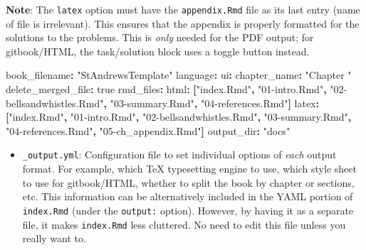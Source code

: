 \documentclass[
  british,
  oneside]{krantz}
\newenvironment{Shaded}{\begin{snugshade}}{\end{snugshade}}
\newcommand{\AttributeTok}[1]{\textcolor[rgb]{0.77,0.63,0.00}{#1}}
\newcommand{\CharTok}[1]{\textcolor[rgb]{0.31,0.60,0.02}{#1}}
\newcommand{\FunctionTok}[1]{\textcolor[rgb]{0.00,0.00,0.00}{#1}}
\newcommand{\KeywordTok}[1]{\textcolor[rgb]{0.13,0.29,0.53}{\textbf{#1}}}
\newcommand{\StringTok}[1]{\textcolor[rgb]{0.31,0.60,0.02}{#1}}
\providecommand{\tightlist}{%
  \setlength{\itemsep}{0pt}\setlength{\parskip}{0pt}}
\theoremstyle{definition}
\theoremstyle{definition}
\theoremstyle{definition}
\theoremstyle{definition}
\theoremstyle{remark}
\begin{document}
\textbf{Note}: The \texttt{latex} option must have the \texttt{appendix.Rmd} file as its last entry (name of file is irrelevant). This ensures that the appendix is properly formatted for the solutions to the problems. This is \emph{only} needed for the PDF output; for gitbook/HTML, the task/solution block uses a toggle button instead.

\begin{Shaded}
\begin{Highlighting}[]
\FunctionTok{book\_filename}\KeywordTok{:}\AttributeTok{ }\StringTok{"StAndrewsTemplate"}
\FunctionTok{language}\KeywordTok{:}
\AttributeTok{  }\FunctionTok{ui}\KeywordTok{:}
\AttributeTok{    }\FunctionTok{chapter\_name}\KeywordTok{:}\AttributeTok{ }\StringTok{"Chapter "}
\FunctionTok{delete\_merged\_file}\KeywordTok{:}\AttributeTok{ }\CharTok{true}
\FunctionTok{rmd\_files}\KeywordTok{:}
\AttributeTok{  }\FunctionTok{html}\KeywordTok{:}\AttributeTok{ }\KeywordTok{[}\StringTok{"index.Rmd"}\KeywordTok{,}\AttributeTok{ }\StringTok{"01{-}intro.Rmd"}\KeywordTok{,}\AttributeTok{ }\StringTok{"02{-}bellsandwhistles.Rmd"}\KeywordTok{,}\AttributeTok{ }\StringTok{"03{-}summary.Rmd"}\KeywordTok{,}\AttributeTok{ }\StringTok{"04{-}references.Rmd"}\KeywordTok{]}
\AttributeTok{  }\FunctionTok{latex}\KeywordTok{:}\AttributeTok{ }\KeywordTok{[}\StringTok{"index.Rmd"}\KeywordTok{,}\AttributeTok{ }\StringTok{"01{-}intro.Rmd"}\KeywordTok{,}\AttributeTok{ }\StringTok{"02{-}bellsandwhistles.Rmd"}\KeywordTok{,}\AttributeTok{ }\StringTok{"03{-}summary.Rmd"}\KeywordTok{,}\AttributeTok{  }\StringTok{"04{-}references.Rmd"}\KeywordTok{,}\AttributeTok{ }\StringTok{"05{-}ch\_appendix.Rmd"}\KeywordTok{]}
\FunctionTok{output\_dir}\KeywordTok{:}\AttributeTok{ }\StringTok{"docs"}
\end{Highlighting}
\end{Shaded}

\begin{itemize}
\tightlist
\item
  \texttt{\_output.yml}: Configuration file to set individual options of \emph{each} output format. For example, which TeX typesetting engine to use, which style sheet to use for gitbook/HTML, whether to split the book by chapter or sections, etc. This information can be alternatively included in the YAML portion of \texttt{index.Rmd} (under the \texttt{output:} option). However, by having it as a separate file, it makes \texttt{index.Rmd} less cluttered. No need to edit this file unless you really want to.
\end{itemize}
\end{document}
